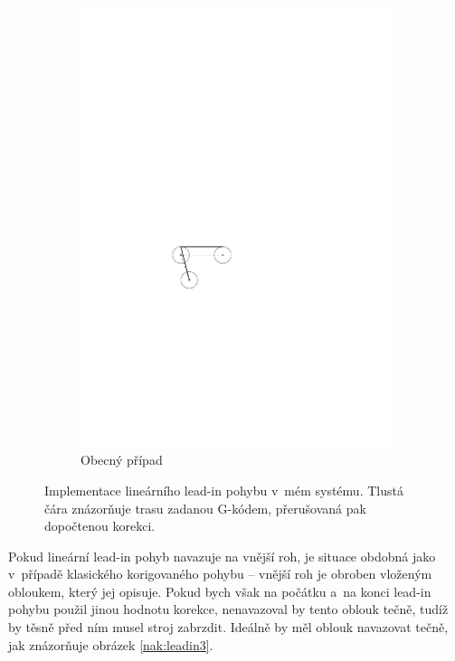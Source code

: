\begin{figure}[h]
\begin{subfigure}[b]{0.3\textwidth}
						\includegraphics[width=\textwidth]{img/korekce-leadin2.pdf}
						\caption{Obecný případ}
					\end{subfigure}
				\caption{Implementace lineárního lead-in pohybu v~mém systému. Tlustá čára znázorňuje trasu zadanou G-kódem, přerušovaná pak dopočtenou korekci.}\label{nak:leadin1}
			\end{figure}
			
			Pokud lineární lead-in pohyb navazuje na vnější roh, je situace obdobná jako v~případě klasického korigovaného pohybu -- vnější roh je obroben vloženým obloukem, který jej opisuje. Pokud bych však na počátku a~na konci lead-in pohybu použil jinou hodnotu korekce, nenavazoval by tento oblouk tečně, tudíž by těsně před ním musel stroj zabrzdit. Ideálně by měl oblouk navazovat tečně, jak znázorňuje obrázek \ref{nak:leadin3}.
			
